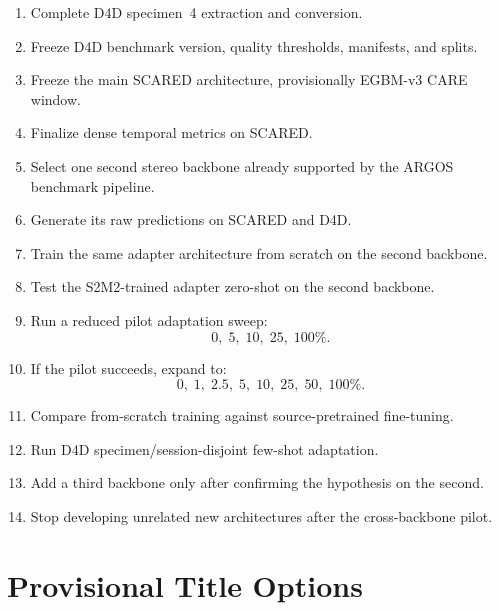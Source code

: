 \documentclass[11pt,a4paper]{article}
\newcommand{\smodel}{S2M2}
\begin{document}
\begin{enumerate}[leftmargin=*]
    \item Complete D4D specimen~4 extraction and conversion.

    \item Freeze D4D benchmark version, quality thresholds, manifests, and splits.

    \item Freeze the main SCARED architecture, provisionally EGBM-v3 CARE window.

    \item Finalize dense temporal metrics on SCARED.

    \item Select one second stereo backbone already supported by the ARGOS
    benchmark pipeline.

    \item Generate its raw predictions on SCARED and D4D.

    \item Train the same adapter architecture from scratch on the second backbone.

    \item Test the \smodel-trained adapter zero-shot on the second backbone.

    \item Run a reduced pilot adaptation sweep:
    \[
        0,\; 5,\; 10,\; 25,\; 100\%.
    \]

    \item If the pilot succeeds, expand to:
    \[
        0,\; 1,\; 2.5,\; 5,\; 10,\; 25,\; 50,\; 100\%.
    \]

    \item Compare from-scratch training against source-pretrained fine-tuning.

    \item Run D4D specimen/session-disjoint few-shot adaptation.

    \item Add a third backbone only after confirming the hypothesis on the second.

    \item Stop developing unrelated new architectures after the cross-backbone
    pilot.
\end{enumerate}

\section{Provisional Title Options}
\end{document}
